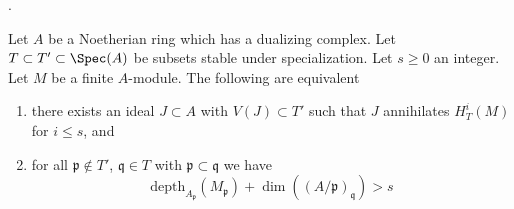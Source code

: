 %

\begin{proposition}
\label{proposition-annihilator}
\begin{reference}
\cite{Faltings-annulators}.
\end{reference}
Let $A$ be a Noetherian ring which has a dualizing complex.
Let $T \subset T' \subset \Spec(A)$ be subsets stable under
specialization. Let $s \geq 0$ an integer. Let $M$ be a finite $A$-module.
The following are equivalent
\begin{enumerate}
\item there exists an ideal $J \subset A$ with $V(J) \subset T'$
such that $J$ annihilates $H^i_T(M)$ for $i \leq s$, and
\item for all $\mathfrak p \not \in T'$,
$\mathfrak q \in T$ with $\mathfrak p \subset \mathfrak q$
we have
$$
\text{depth}_{A_\mathfrak p}(M_\mathfrak p) +
\dim((A/\mathfrak p)_\mathfrak q) > s
$$
\end{enumerate}
\end{proposition}

